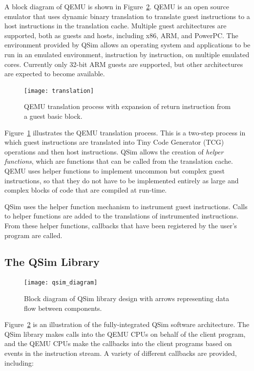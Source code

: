 \documentclass[letterpaper, 10pt]{book}
\begin{document}
A block diagram of QEMU is shown in Figure~\ref{fig:qsim}. QEMU is an open
source emulator that uses dynamic binary translation to translate guest
instructions to a host instructions in the translation cache. Multiple
guest architectures are supported, both as guests and hosts, including x86,
ARM, and PowerPC. The environment provided by QSim allows an operating system
and applications to be run in an emulated environment, instruction by
instruction, on multiple emulated cores. Currently only 32-bit ARM guests are
supported, but other architectures are expected to become available.

\begin{figure}
\begin{center}
\texttt{[image: translation]}
\caption{QEMU translation process with expansion of return instruction from a
  guest basic block.}
\label{fig:translation}
\end{center}
\end{figure}

Figure~\ref{fig:translation} illustrates the QEMU translation process. This is a
two-step process in which guest instructions are translated into Tiny Code
Generator (TCG) operations and then host instructions. QSim allows the creation
of \emph{helper functions}, which are functions that can be called from the
translation cache. QEMU uses helper functions to implement uncommon but complex
guest instructions, so that they do not have to be implemented entirely as large
and complex blocks of code that are compiled at run-time.

QSim uses the helper function mechanism to instrument guest instructions. Calls
to helper functions are added to the translations of instrumented instructions.
From these helper functions, callbacks that have been registered by the user's
program are called.

\subsection{The QSim Library}

\begin{figure}
\begin{center}
\texttt{[image: qsim\_diagram]}
\caption{Block diagram of QSim library design with arrows representing data flow
         between components.}
\label{fig:qsim}
\end{center}
\end{figure}

Figure~\ref{fig:qsim} is an illustration of the fully-integrated
QSim software architecture. The QSim library makes calls into the QEMU CPUs on
behalf of the client program, and the QEMU CPUs make the callbacks into the
client programs based on events in the instruction stream. A variety of
different callbacks are provided, including:
\end{document}

